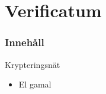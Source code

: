 \section{Verificatum}
\begin{frame}
\frametitle{Innehåll}
\tableofcontents[currentsection]
\end{frame}

\begin{frame}{Krypteringsnät}


\begin{center}
\end{center}

\begin{itemize}
\item El gamal
\end{itemize}

\end{frame}

